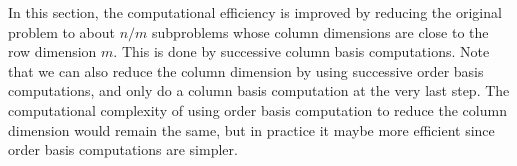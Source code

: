\begin{rem}
In this section, the computational efficiency is improved by reducing
the original problem to about $n/m$ subproblems whose column dimensions
are close to the row dimension $m$. This is done by successive column
basis computations. Note that we can also reduce the column dimension
by using successive order basis computations, and only do a column
basis computation at the very last step. The computational complexity
of using order basis computation to reduce the column dimension would
remain the same, but in practice it maybe more efficient since order
basis computations are simpler. \end{rem}

